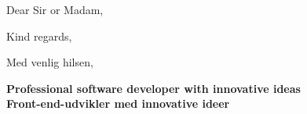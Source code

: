\documentclass[11pt,a4paper,sans]{moderncv}        %
\begin{document}
\date{}

\ifenglish
\opening{Dear Sir or Madam,}
\else
\fi

\ifenglish
\closing{Kind regards,}
\else
\closing{Med venlig hilsen,}
\fi

\ifenglish
{}          %
\else
\fi

\makelettertitle

\ifenglish
\textbf{Professional software developer with innovative ideas}\\
\else
\textbf{Front-end-udvikler med innovative ideer}\\
\fi
\end{document}
